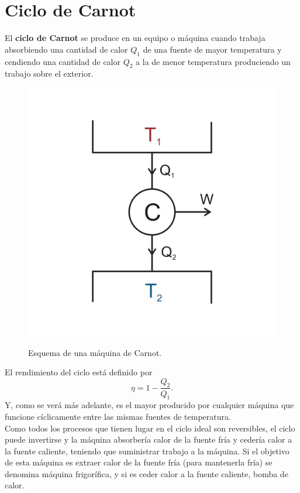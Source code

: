 \section{Ciclo de Carnot}
El \textbf{ciclo de Carnot} se produce en un equipo o máquina cuando trabaja absorbiendo una cantidad de calor $Q_1$ de una fuente de mayor temperatura y cendiendo una cantidad de calor $Q_2$ a la de menor temperatura produciendo un trabajo sobre el exterior.

	\begin{figure}[H]
		\centering
		\includegraphics[scale=0.1]{./img/carnot.png}
		\label{carnot}
		\caption{Esquema de una máquina de Carnot.}
	\end{figure}

El rendimiento del ciclo está definido por
	$$ \eta = 1 - \frac{Q_2}{Q_1}. $$
Y, como se verá más adelante, es el mayor producido por cualquier máquina que funcione cíclicamente entre las mismas fuentes de temperatura. \\
Como todos los procesos que tienen lugar en el ciclo ideal son reversibles, el ciclo puede invertirse y la máquina absorbería calor de la fuente fría y cedería calor a la fuente caliente, teniendo que suministrar trabajo a la máquina. Si el objetivo de esta máquina es extraer calor de la fuente fría (para mantenerla fría) se denomina máquina frigorífica, y si es ceder calor a la fuente caliente, bomba de calor. \\


